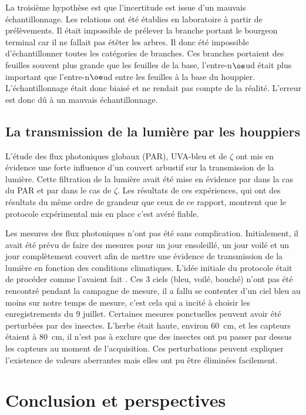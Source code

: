 \documentclass[12pt]{report}
\begin{document}
La troisième hypothèse est que l'incertitude est issue d'un mauvais
échantillonnage. Les relations ont été établies en laboratoire à partir de
prélèvements. Il était impossible de prélever la branche portant le bourgeon
terminal car il ne fallait pas étêter les arbres. Il donc été impossible
d'échantillonner toutes les catégories de branches. Ces branches portaient des
feuilles souvent plus grande que les feuilles de la base, l'entre-n$\oe$ud était
plus important que l'entre-n$\oe$ud entre les feuilles à la base du houppier.
L'échantillonnage était donc biaisé et ne rendait pas compte de la réalité.
L'erreur est donc dû à un mauvais échantillonnage.


\section{La transmission de la lumière par les houppiers}

L'étude des flux photoniques globaux (PAR), UVA-bleu et de $\zeta$ ont mis en
évidence une forte influence d'un couvert arbustif sur la transmission de la
lumière. Cette filtration de la lumière avait été mise en évidence par
\citet{MAR_ref36} dans la cas du PAR et par \citet{MAR_ref30} dans le cas de
$\zeta$. Les résultats de ces expériences, qui ont des résultats du même ordre
de grandeur que ceux de ce rapport, montrent que le protocole expérimental
mis en place c'est avéré fiable.

Les mesures des flux photoniques n'ont pas été sans complication. Initialement,
il avait été prévu de faire des mesures pour un jour ensoleillé, un jour voilé
et un jour complètement couvert afin de mettre une évidence de transmission de
la lumière en fonction des conditions climatiques. L'idée initiale du protocole
était de procéder comme l'avaient fait \citet{MAR_ref36}. Ces 3 ciels (bleu,
voilé, bouché) n'ont pas été rencontré pendant la campagne de mesure, il a fallu
se contenter d'un ciel bleu au moins sur notre temps de mesure, c'est cela qui a
incité à choisir les enregistrements du 9 juillet. Certaines mesures ponctuelles
peuvent avoir été perturbées par des insectes. L'herbe était haute, environ
60~cm, et les capteurs étaient à 80~cm, il n'est pas à exclure que des insectes
ont pu passer par dessus les capteurs au moment de l'acquisition. Ces
perturbations peuvent expliquer l'existence de valeurs aberrantes mais elles ont
pu être éliminées facilement.


\chapter{Conclusion et perspectives}
\end{document}
